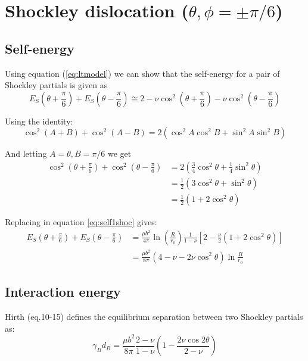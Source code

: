 \documentclass[10pt,a4paper,draft]{article}
\begin{document}
\section{Shockley dislocation ($\theta, \phi=\pm\pi/6$)}
\subsection{Self-energy}
Using equation (\ref{eq:ltmodel}) we can show that the self-energy for a pair of Shockley partials is given as
\begin{equation}
E_S\left(\theta+\frac{\pi}{6}\right) + E_S\left(\theta-\frac{\pi}{6}\right) \cong 2 - \nu\cos^2\left(\theta+\frac{\pi}{6}\right) - \nu\cos^2\left(\theta-\frac{\pi}{6}\right) \label{eq:self1shoc}
\end{equation}

Using the identity: 
\begin{equation}
\cos^2(A+B) + \cos^2(A-B) = 2(\cos^2A\cos^2B + \sin^2A\sin^2B) \label{eqcosplus}
\end{equation}

And letting $A = \theta, B = \pi/6$ we get
\begin{subequations}
\begin{align*}
\cos^2\left(\theta+\frac{\pi}{6}\right) + \cos^2\left(\theta-\frac{\pi}{6}\right) &= 
2\left(\frac{3}{4}\cos^2\theta + \frac{1}{4}\sin^2\theta \right) \\
&= \frac{1}{2}(3\cos^2\theta + \sin^2\theta) \\
&= \frac{1}{2}(1+2\cos^2\theta)
\end{align*}
\end{subequations}

Replacing in equation \ref{eq:self1shoc} gives:
\begin{equation}
\begin{split}
E_S\left(\theta+\frac{\pi}{6}\right) + E_S\left(\theta-\frac{\pi}{6}\right) &=
\frac{\mu b^2}{4\pi}\ln\left(\frac{R}{r_0}\right)\frac{1}{1-\nu}\left[2-\frac{\nu}{2}(1+2\cos^2\theta)\right] \\
&=\frac{\mu b^2}{8\pi}(4-\nu-2\nu\cos^2\theta)\ln\frac{R}{r_0} \label{eq:e_self_shockley}
\end{split}
\end{equation}

\subsection{Interaction energy}
Hirth \cite{hirth1982theory}(eq.10-15) defines the equilibrium separation between two Shockley partials as:
\begin{equation}
\gamma_B d_B = \frac{\mu b^2}{8\pi}\frac{2-\nu}{1-\nu}\left(1-\frac{2\nu\cos2\theta}{2-\nu}\right)
\label{eq:hirth1015}
\end{equation}
\end{document}
